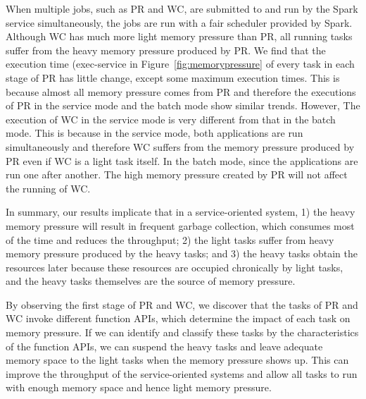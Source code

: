 When multiple jobs, such as PR and WC, are submitted to and run by the Spark service simultaneously, the jobs are run with a fair scheduler provided by Spark. Although WC has much more light memory pressure  than PR, all running tasks suffer from the heavy memory pressure produced by PR. We find that the execution time (exec-service in Figure~\ref{fig:memorypressure} of every task in each stage of PR has little change, except some maximum execution times. This is because almost all memory pressure comes from PR and therefore the executions of PR in the service mode and the batch mode show similar trends. However, The execution of WC in the service mode is very different from that in the batch mode. This is because in the service mode, both applications are run simultaneously and therefore WC suffers from the memory pressure produced by PR even if WC is a light task itself. In the batch mode, since the applications are run one after another. The high memory pressure created by PR will not affect the running of WC.

In summary, our results implicate that in a service-oriented system, 1) the heavy memory pressure will result in frequent garbage collection, which consumes most of the time and reduces the throughput; 2) the light tasks suffer from heavy memory pressure produced by the heavy tasks; and 3) the heavy tasks obtain the resources later because these resources are occupied chronically by light tasks, and the heavy tasks themselves are the source of memory pressure.

By observing the first stage of PR and WC, we discover that the tasks of PR and WC invoke different function APIs, which determine the impact of each task on memory pressure. If we can identify and classify these tasks by the characteristics of the function APIs, we can suspend the heavy tasks and leave adequate memory space to the light tasks when the memory pressure shows up. This can improve the throughput of the service-oriented systems and allow all tasks to run with enough memory space and hence light memory pressure. 
  
